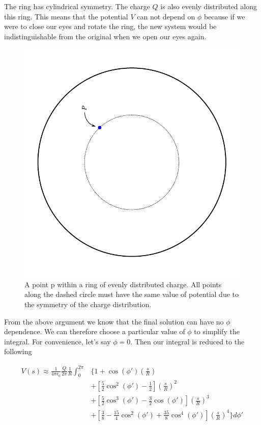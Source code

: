 \documentclass[a4paper, 11pt]{article}
\newenvironment{solution}{%
	\begin{list}{}{%
			\setlength{\topsep}{0pt}%
			\setlength{\leftmargin}{0.5cm}%
			\setlength{\rightmargin}{0.5cm}%
			\setlength{\listparindent}{\parindent}%
			\setlength{\itemindent}{\parindent}%
			\setlength{\parsep}{\parskip}%
		}%
		\item[]}{\end{list}}
\begin{document}
\begin{solution}
  \noindent The ring has cylindrical symmetry. The charge $Q$ is also evenly distributed
  along this ring. This means that the potential $V$ can not depend on $\phi$
  because if we were to close our eyes and rotate the ring, the new system would
  be indistinguishable from the original when we open our eyes again.
  \begin{figure}[!hbt]
    \centering
    \includegraphics[width=0.6\columnwidth, angle=-90]{ring_symmetry}
    \caption{A point p within a ring of evenly distributed charge. All points
      along the dashed circle must have the same value of potential due to the
      symmetry of the charge distribution.}
  \end{figure}


  \noindent From the above argument we know that the final solution can have no
  $\phi$ dependence. We can therefore choose a particular value of $\phi$ to
  simplify the integral. For convenience, let's say $\phi=0$. Then our integral is
  reduced to the following
  
 \begin{equation}
    \begin{split}
      V(s)\approx\frac{1}{4\pi\epsilon_0}\frac{Q}{2\pi}\frac{1}{R}\int_0^{2\pi}&\Bigg\{ 1+\cos(\phi')\left( \frac{s}{R} \right)\\
      &+ \left[ \frac{5}{2}\cos^2(\phi')-\frac{1}{2}  \right]\left( \frac{s}{R} \right)^2\\
      &+ \left[ \frac{5}{2}\cos^3(\phi')-\frac{3}{2}\cos(\phi')    \right]\left( \frac{s}{R} \right)^3\\
      &+ \left[ \frac{3}{8}-\frac{15}{4}\cos^2(\phi')+\frac{35}{8}\cos^4(\phi') \right]\left( \frac{s}{R} \right)^4  \Bigg\}d\phi'
    \end{split}
  \end{equation}


\end{solution}
\end{document}
